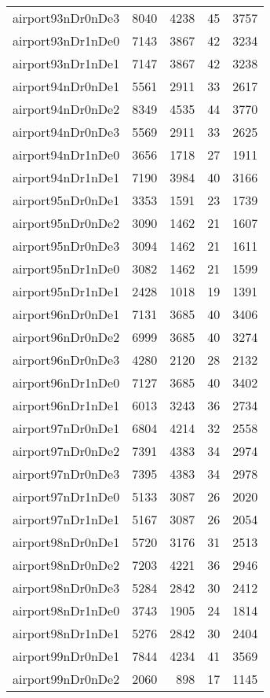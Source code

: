 \begin{longtable}{lrrrr}
airport93nDr0nDe3 & 8040 & 4238 & 45 & 3757 \\
airport93nDr1nDe0 & 7143 & 3867 & 42 & 3234 \\
airport93nDr1nDe1 & 7147 & 3867 & 42 & 3238 \\
airport94nDr0nDe1 & 5561 & 2911 & 33 & 2617 \\
airport94nDr0nDe2 & 8349 & 4535 & 44 & 3770 \\
airport94nDr0nDe3 & 5569 & 2911 & 33 & 2625 \\
airport94nDr1nDe0 & 3656 & 1718 & 27 & 1911 \\
airport94nDr1nDe1 & 7190 & 3984 & 40 & 3166 \\
airport95nDr0nDe1 & 3353 & 1591 & 23 & 1739 \\
airport95nDr0nDe2 & 3090 & 1462 & 21 & 1607 \\
airport95nDr0nDe3 & 3094 & 1462 & 21 & 1611 \\
airport95nDr1nDe0 & 3082 & 1462 & 21 & 1599 \\
airport95nDr1nDe1 & 2428 & 1018 & 19 & 1391 \\
airport96nDr0nDe1 & 7131 & 3685 & 40 & 3406 \\
airport96nDr0nDe2 & 6999 & 3685 & 40 & 3274 \\
airport96nDr0nDe3 & 4280 & 2120 & 28 & 2132 \\
airport96nDr1nDe0 & 7127 & 3685 & 40 & 3402 \\
airport96nDr1nDe1 & 6013 & 3243 & 36 & 2734 \\
airport97nDr0nDe1 & 6804 & 4214 & 32 & 2558 \\
airport97nDr0nDe2 & 7391 & 4383 & 34 & 2974 \\
airport97nDr0nDe3 & 7395 & 4383 & 34 & 2978 \\
airport97nDr1nDe0 & 5133 & 3087 & 26 & 2020 \\
airport97nDr1nDe1 & 5167 & 3087 & 26 & 2054 \\
airport98nDr0nDe1 & 5720 & 3176 & 31 & 2513 \\
airport98nDr0nDe2 & 7203 & 4221 & 36 & 2946 \\
airport98nDr0nDe3 & 5284 & 2842 & 30 & 2412 \\
airport98nDr1nDe0 & 3743 & 1905 & 24 & 1814 \\
airport98nDr1nDe1 & 5276 & 2842 & 30 & 2404 \\
airport99nDr0nDe1 & 7844 & 4234 & 41 & 3569 \\
airport99nDr0nDe2 & 2060 & 898 & 17 & 1145 \\

\end{longtable}
